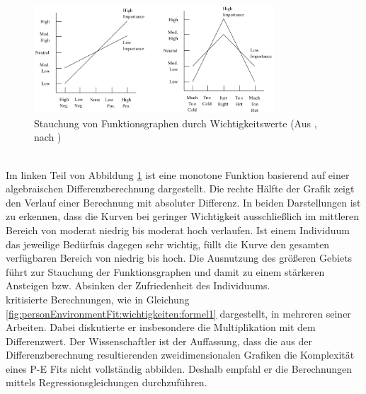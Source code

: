 \begin{figure}[h]
	\centering
	\includegraphics[width=0.8\textwidth]{gfx/Locke.png}
	\caption{Stauchung von Funktionsgraphen durch Wichtigkeitswerte (Aus \cite[S. 13f.]{edwards:2008}, nach \cite[S. 1305]{locke:1976})}
	\label{fig:personEnvironmentFit:wichtigkeiten:abb1}
\end{figure}\\
Im linken Teil von Abbildung \ref{fig:personEnvironmentFit:wichtigkeiten:abb1} ist eine monotone Funktion basierend auf einer algebraischen Differenzberechnung dargestellt. Die rechte Hälfte der Grafik zeigt den Verlauf einer Berechnung mit absoluter Differenz. In beiden Darstellungen ist zu erkennen, dass die Kurven bei geringer Wichtigkeit ausschließlich im mittleren Bereich von moderat niedrig bis moderat hoch verlaufen. Ist einem Individuum das jeweilige Bedürfnis dagegen sehr wichtig, füllt die Kurve den gesamten verfügbaren Bereich von niedrig bis hoch. Die Ausnutzung des größeren Gebiets führt zur Stauchung der Funktionsgraphen und damit zu einem stärkeren Ansteigen bzw. Absinken der Zufriedenheit des Individuums. \\
\textcite[S. 51ff.]{edwards:1991}\cite[S. 9ff.]{edwards:1990}\cite[S. 2ff.]{edwards:1993}\cite[S. 2ff.]{edwards:1993b} kritisierte Berechnungen, wie in Gleichung \ref{fig:personEnvironmentFit:wichtigkeiten:formel1} dargestellt, in mehreren seiner Arbeiten. Dabei diskutierte er insbesondere die Multiplikation mit dem Differenzwert. Der Wissenschaftler ist der Auffassung, dass die aus der Differenzberechnung resultierenden zweidimensionalen Grafiken die Komplexität eines P-E Fits nicht vollständig abbilden. Deshalb empfahl er die Berechnungen mittels Regressionsgleichungen durchzuführen.

